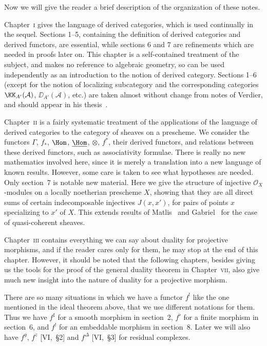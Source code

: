 \bigskip

Now we will give the reader a brief description of the organization of these notes.

Chapter~\textsc{i} gives the language of derived categories, which is used continually in the sequel. Sections 1--5, containing the definition of derived categories and derived functors, are essential, while sections 6 and 7 are refinements which are needed in proofs later on. This chapter is a self-contained treatment of the subject, and makes no reference to algebraic geometry, so can be used independently as an introduction to the notion of derived category. Sections 1--6 (except for the notion of localizing subcategory and the corresponding categories $\KK_{A'}(\mathcal{A})$, $\DD_{A'}(\mathcal{A})$, etc.) are taken almost without change from notes of Verdier, and should appear in his thesis~\cite{18}.


Chapter~\textsc{ii} is a fairly systematic treatment of the applications of the language of derived categories to the category of sheaves on a prescheme. We consider the functors $\Gamma$, $f_{*}$, $\Hom$, $\underline{\Hom}$, $\otimes$, $f^{*}$, their derived functors, and relations between these derived functors, such as associativity formulae. There is really no new mathematics involved here, since it is merely a translation into a new language of known results. However, some care is taken to see what hypotheses are needed. Only section~7 is notable new material. Here we give the structure of injective $\mathcal{O}_{X}$-modules on a locally noetherian prescheme $X$, showing that they are all direct sums of certain indecomposable injectives $J(x,x')$, for pairs of points $x$ specializing to $x'$ of $X$. This extends results of Matlis~\cite{13} and Gabriel~\cite{5} for the case of quasi-coherent sheaves.

Chapter~\textsc{iii} contains everything we can say about duality for projective morphisms, and if the reader cares only for them, he may stop at the end of this chapter. However, it should be noted that the following chapters, besides giving us the tools for the proof of the general duality theorem in Chapter~\textsc{vii}, also give much new insight into the nature of duality for a projective morphism.

There are so many situations in which we have a functor $f^{!}$ like the one mentioned in the ideal theorem above, that we use different notations for them. Thus we have $f^{\sharp}$ for a smooth morphism in section~2, $f^{\flat}$ for a finite morphism in section~6, and $f^{!}$ for an embeddable morphism in section~8. Later we will also have $f^{y}$, $f^{z}$ [VI,~\S2] and $f^{\Delta}$ [VI,~\S3] for residual complexes.

